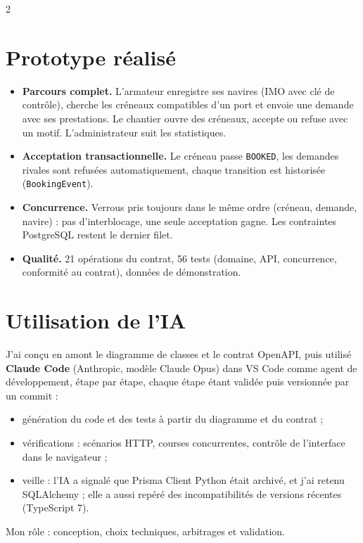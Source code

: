\documentclass[10pt,a4paper]{article}
\newcommand{\code}[1]{\texttt{\small #1}}
\begin{document}
\begin{multicols}{2}
\section{Prototype réalisé}
\begin{itemize}
  \item \textbf{Parcours complet.} L'armateur enregistre ses navires (IMO avec clé de contrôle), cherche les créneaux compatibles d'un port et envoie une demande avec ses prestations. Le chantier ouvre des créneaux, accepte ou refuse avec un motif. L'administrateur suit les statistiques.
  \item \textbf{Acceptation transactionnelle.} Le créneau passe \code{BOOKED}, les demandes rivales sont refusées automatiquement, chaque transition est historisée (\code{BookingEvent}).
  \item \textbf{Concurrence.} Verrous pris toujours dans le même ordre (créneau, demande, navire) : pas d'interblocage, une seule acceptation gagne. Les contraintes PostgreSQL restent le dernier filet.
  \item \textbf{Qualité.} 21 opérations du contrat, 56 tests (domaine, API, concurrence, conformité au contrat), données de démonstration.
\end{itemize}

\columnbreak
\section{Utilisation de l'IA}
J'ai conçu en amont le diagramme de classes et le contrat OpenAPI, puis utilisé \textbf{Claude Code} (Anthropic, modèle Claude Opus) dans VS Code comme agent de développement, étape par étape, chaque étape étant validée puis versionnée par un commit :
\begin{itemize}
  \item génération du code et des tests à partir du diagramme et du contrat ;
  \item vérifications : scénarios HTTP, courses concurrentes, contrôle de l'interface dans le navigateur ;
  \item veille : l'IA a signalé que Prisma Client Python était archivé, et j'ai retenu SQLAlchemy ; elle a aussi repéré des incompatibilités de versions récentes (TypeScript 7).
\end{itemize}
Mon rôle : conception, choix techniques, arbitrages et validation.


\end{multicols}
\end{document}
